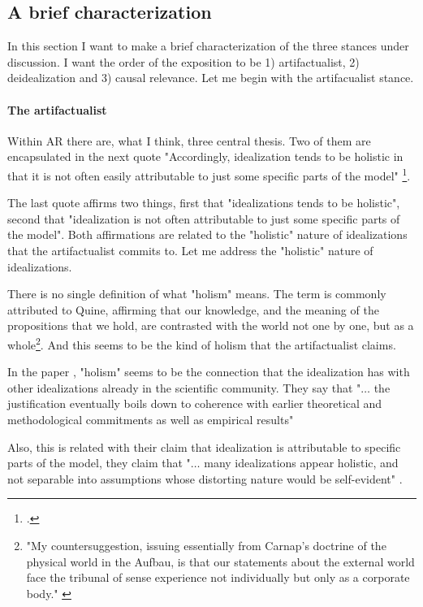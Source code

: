 \subsection{A brief characterization}

In this section I want to make a brief characterization of the three stances under discussion.
I want the order of the exposition to be 1) artifactualist, 2) deidealization and 3) causal relevance.
Let me begin with the artifacualist stance.

\paragraph{The artifactualist}

Within AR there are, what I think, three central thesis.
Two of them are encapsulated in the next quote "Accordingly, idealization tends to be holistic in that it is not often easily attributable to just some specific parts of the model" \footcite[][p. 3]{Carrillo2021-CARAAP-12}.

The last quote affirms two things, first that "idealizations tends to be holistic", second that "idealization is not often attributable to just some specific parts of the model".
Both affirmations are related to the "holistic" nature of idealizations that the artifactualist commits to.
Let me address the "holistic" nature of idealizations.

There is no single definition of what "holism" means.
The term is commonly attributed to Quine, affirming that our knowledge, and the meaning of the propositions that we hold, are contrasted with the world not one by one, but as a whole\footnote{"My countersuggestion, issuing essentially from  Carnap's doctrine of the physical world in the Aufbau, is that our  statements about the external world face the tribunal of sense experience not individually but only as a corporate body." \parencite[][p. 38]{Quine1951} }.
And this seems to be the kind of holism that the artifactualist claims.

In the paper , "holism" seems to be the connection that the idealization has with other idealizations already in the scientific community.
They say that "$\ldots$ the justification eventually boils down to coherence with earlier theoretical and methodological commitments as well as empirical results" \parencite[][p. 52]{Carrillo2022}

Also, this is related with their claim that idealization is attributable to specific parts of the model, they claim that "$\ldots$ many idealizations appear holistic, and not separable into assumptions whose distorting nature would be self-evident" \parencite[][p. 57]{Carrillo2022}.

